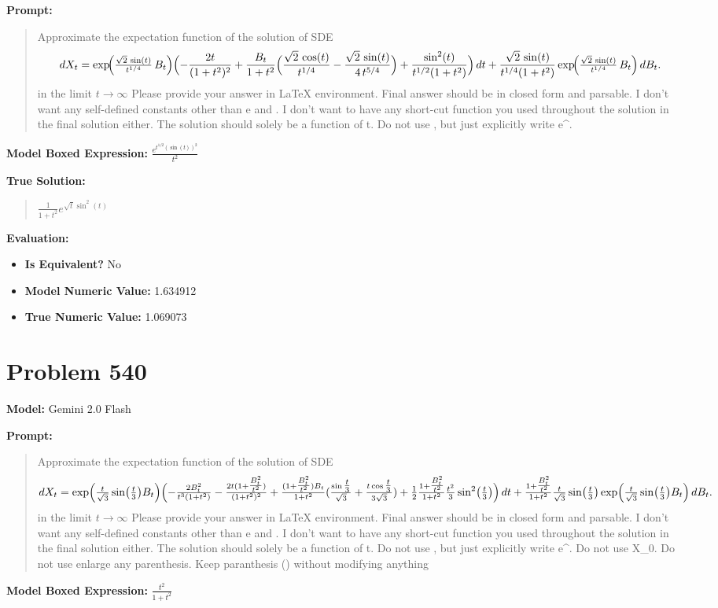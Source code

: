 \documentclass{article}
\begin{document}
\textbf{Prompt:}
\begin{quote}
Approximate the expectation function of the solution of SDE $$dX_t =\exp\!\Bigl(\tfrac{\sqrt2\,\sin(t)}{t^{1/4}}\,B_t\Bigr)\Bigl(-\frac{2t}{(1+t^2)^2}+\frac{B_t}{1+t^2}\Bigl(\frac{\sqrt2\,\cos(t)}{t^{1/4}}-\frac{\sqrt2\,\sin(t)}{4\,t^{5/4}}\Bigr)+\frac{\sin^2(t)}{t^{1/2}(1+t^2)}\Bigr)\,dt+\frac{\sqrt2\,\sin(t)}{t^{1/4}(1+t^2)}\exp\!\Bigl(\tfrac{\sqrt2\,\sin(t)}{t^{1/4}}\,B_t\Bigr)\,dB_t.$$ in the limit $t \to \infty$ Please provide your answer in LaTeX \boxed{} environment. Final answer should be in closed form and parsable. I don't want any self-defined constants other than e and \pi. I don't want to have any short-cut function you used throughout the solution in the final solution either. The solution should solely be a function of t. Do not use \exp, but just explicitly write e^.
\end{quote}
\textbf{Model Boxed Expression:} $\frac{e^{t^{1/2}(\sin(t))^2}}{t^2}$

\textbf{True Solution:}
\begin{quote}
$\frac{1}{1 + t^2} e^{\sqrt{t} \sin^2(t)}$
\end{quote}

\textbf{Evaluation:}
\begin{itemize}
\item \textbf{Is Equivalent?} No
\item \textbf{Model Numeric Value:} 1.634912
\item \textbf{True Numeric Value:} 1.069073
\end{itemize}
\vspace{1cm}
\section*{Problem 540}
\textbf{Model:} Gemini 2.0 Flash

\textbf{Prompt:}
\begin{quote}
Approximate the expectation function of the solution of SDE $$ dX_t=\exp\Bigl(\tfrac{t}{\sqrt3}\sin\bigl(\tfrac{t}{3}\bigr)B_t\Bigr)\Bigl(-\tfrac{2B_t^2}{t^3(1+t^2)}-\tfrac{2t(1+\tfrac{B_t^2}{t^2})}{(1+t^2)^2}+\tfrac{(1+\tfrac{B_t^2}{t^2})B_t}{1+t^2}(\tfrac{\sin\tfrac{t}{3}}{\sqrt3}+\tfrac{t\cos\tfrac{t}{3}}{3\sqrt3})+\tfrac12\tfrac{1+\tfrac{B_t^2}{t^2}}{1+t^2}\tfrac{t^2}{3}\sin^2\bigl(\tfrac{t}{3}\bigr)\Bigr)\,dt+\tfrac{1+\tfrac{B_t^2}{t^2}}{1+t^2}\tfrac{t}{\sqrt3}\sin\bigl(\tfrac{t}{3}\bigr)\exp\Bigl(\tfrac{t}{\sqrt3}\sin\bigl(\tfrac{t}{3}\bigr)B_t\Bigr)\,dB_t.$$ in the limit $t \to \infty$ Please provide your answer in LaTeX \boxed{} environment. Final answer should be in closed form and parsable. I don't want any self-defined constants other than e and \pi. I don't want to have any short-cut function you used throughout the solution in the final solution either. The solution should solely be a function of t. Do not use \exp, but just explicitly write e^. Do not use X_0. Do not use enlarge any parenthesis. Keep paranthesis () without modifying anything
\end{quote}
\textbf{Model Boxed Expression:} $\frac{t^2}{1+t^2}$
\end{document}
